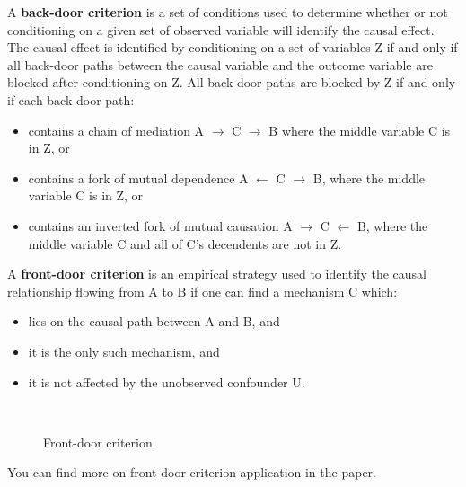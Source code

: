 A \textbf{back-door criterion} is a set of conditions used to determine whether or not conditioning on a given set of observed variable will identify the causal effect. The causal effect is identified by conditioning on a set of variables Z if and only if all back-door paths between the causal variable and the outcome variable are blocked after conditioning on Z. All back-door paths are blocked by Z if and only if each back-door path:

\begin{itemize}

\item contains a chain of mediation A $\rightarrow$ C $\rightarrow$  B where the middle variable C is in Z, or

\item contains a fork of mutual dependence A $\leftarrow$ C $\rightarrow$ B, where the middle variable C is in Z, or

\item contains an inverted fork of mutual causation A $\rightarrow$ C $\leftarrow$  B, where the middle variable C and all of C's decendents are not in Z.

\end{itemize}

A \textbf{front-door criterion} is an empirical strategy used to identify the causal relationship flowing from A to B if one can find a mechanism C which:

\begin{itemize}

\item  lies on the causal path between A and B, and 

\item it is the only such mechanism, and 

\item it is not affected by the unobserved confounder U.

\end{itemize}

\begin{figure}[htp]\centering
\caption{Front-door criterion}\
\end{figure}

You can find more on front-door criterion application in the \cite{Bellemare.2020} paper.

\nocite{Morgan.2014}
\nocite{Pearl.2009}





